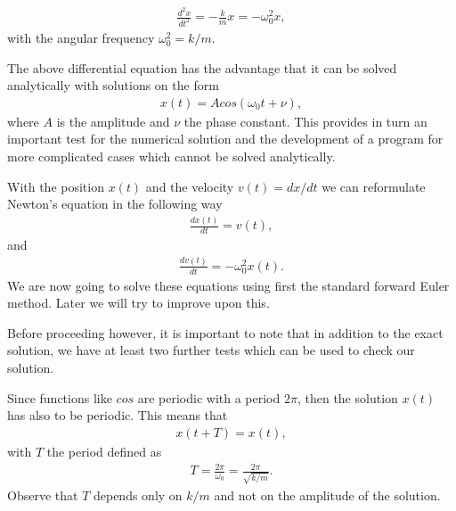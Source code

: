\documentclass[letterpaper,10pt,english]{sphinxmanual}
\begin{document}
\begin{equation*}
\begin{split}
\frac{d^2x}{dt^2}=-\frac{k}{m}x=-\omega_0^2x,
\label{eq:newton1} \tag{19}
\end{split}
\end{equation*}
with the angular frequency \(\omega_0^2=k/m\).

The above differential equation has the advantage that it can be solved  analytically with solutions on the form
\begin{equation*}
\begin{split}
x(t)=Acos(\omega_0t+\nu),
\end{split}
\end{equation*}
where \(A\) is the amplitude and \(\nu\) the phase constant.   This provides in turn an important test for the numerical
solution and the development of a program for more complicated cases which cannot be solved analytically.

With the position \(x(t)\) and the velocity  \(v(t)=dx/dt\) we can reformulate Newton’s equation in the following way
\begin{equation*}
\begin{split}
\frac{dx(t)}{dt}=v(t),
\end{split}
\end{equation*}
and
\begin{equation*}
\begin{split}
\frac{dv(t)}{dt}=-\omega_0^2x(t).
\end{split}
\end{equation*}
We are now going to solve these equations using first the standard forward Euler  method. Later we will try to improve upon this.

Before proceeding however, it is important to note that in addition to the exact solution, we have at least two further tests which can be used to check our solution.

Since functions like \(cos\) are periodic with a period \(2\pi\), then the solution \(x(t)\) has also to be periodic. This means that
\begin{equation*}
\begin{split}
x(t+T)=x(t),
\end{split}
\end{equation*}
with \(T\) the period defined as
\begin{equation*}
\begin{split}
T=\frac{2\pi}{\omega_0}=\frac{2\pi}{\sqrt{k/m}}.
\end{split}
\end{equation*}
Observe that \(T\) depends only on \(k/m\) and not on the amplitude of the solution.
\end{document}
